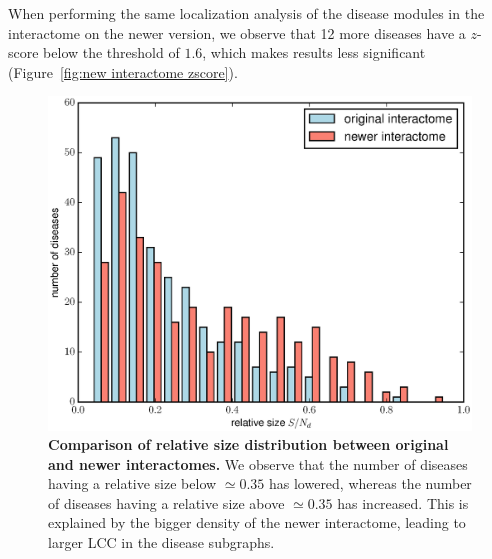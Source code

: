 \documentclass[letterpaper]{article}
\begin{document}
	When performing the same localization analysis of the disease modules in the interactome on the newer version,
	we observe that 12 more diseases have a $z$-score below the threshold of $1.6$, which makes results less significant
	(Figure~\ref{fig:new interactome zscore}).

	\begin{figure}[!h]
		\includegraphics[width=.5\textwidth]{images/rel_sizes_comparison.eps}
		\caption{{\bf Comparison of relative size distribution between original and newer interactomes.}
		We observe that the number of diseases having a relative size below $\simeq 0.35$ has lowered, whereas the number
		of diseases having a relative size above $\simeq 0.35$ has increased. This is explained by the bigger density of
		the newer interactome, leading to larger LCC in the disease subgraphs.
		\label{fig:rel sizes comparison}}
	\end{figure}
\end{document}
